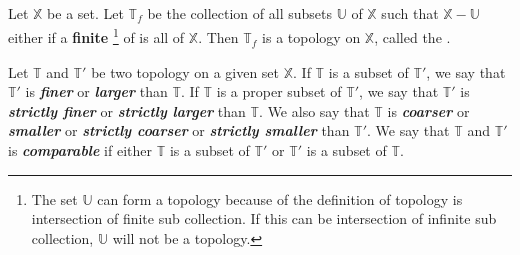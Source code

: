       \begin{definition}\label{def:FiniteComplementTopology}
            Let $ \mathbb{X} $ be a set. Let $ \mathbb{T}_{\mathit{f}} $ be the collection of all subsets $ \mathbb{U} $ of $ \mathbb{X} $ such that $ \mathbb{X} - \mathbb{U} $ either if a \textbf{finite} \footnote{
                  The set $ \mathbb{U} $ can form a topology because of the definition of topology is intersection of finite sub collection. If this can be intersection of infinite sub collection, $ \mathbb{U} $ will not be a topology. 
            } of is all of $ \mathbb{X} $. Then $ \mathbb{T}_{\mathit{f}} $ is a topology on $ \mathbb{X} $, called the \textit{\textbf{}}.
      \end{definition}

      \begin{definition}\label{def:Comparable}
            Let $ \mathbb{T} $ and $ \mathbb{T'} $ be two topology on a given set $ \mathbb{X} $. If $ \mathbb{T} $ is  a subset of $ \mathbb{T'} $, we say that $ \mathbb{T'} $ is \textit{\textbf{finer}} or \textit{\textbf{larger}} than $ \mathbb{T} $. If $ \mathbb{T} $ is a proper subset of $ \mathbb{T'} $, we say that $ \mathbb{T'} $ is \textit{\textbf{strictly finer}} or \textit{\textbf{strictly larger}}  than $ \mathbb{T} $.
            We also say that $ \mathbb{T} $ is \textit{\textbf{coarser}} or \textit{\textbf{smaller}} or \textit{\textbf{strictly coarser}} or \textit{\textbf{strictly smaller}} than $ \mathbb{T'} $.
            We say that $ \mathbb{T} $ and $ \mathbb{T'} $ is \textit{\textbf{comparable}} if either $ \mathbb{T} $ is a subset of $ \mathbb{T'} $ or $ \mathbb{T'} $ is a subset of $ \mathbb{T} $.
      \end{definition}

